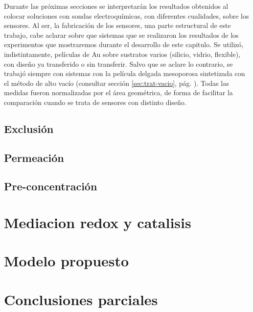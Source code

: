 	Durante las próximas secciones se interpretarán los resultados obtenidos al colocar soluciones con sondas electroquímicas, con diferentes cualidades, sobre los sensores. Al ser,  la fabricación de los sensores, una parte estructural de este trabajo, cabe aclarar sobre que sistemas que se realizaron los resultados de los experimentos que mostraremos durante el desarrollo de este capitulo. Se utilizó, indistintamente, películas de Au sobre sustratos varios (silicio, vidrio, flexible), con diseño ya transferido o sin transferir. Salvo que se aclare lo contrario, se trabajó siempre con sistemas con la película delgada mesoporosa sintetizada con el método de alto vacío (consultar sección \ref{sec:trat-vacio}, pág. \pageref{sec:trat-vacio}). Todas las medidas fueron normalizadas por el área geométrica, de forma de facilitar la comparación cuando se trata de sensores con distinto diseño.  

	\subsection{Exclusión}

	\subsection{Permeación}

	\subsection{Pre-concentración}

\section{Mediacion redox y catalisis}

\section{Modelo propuesto}

\section{Conclusiones parciales}



